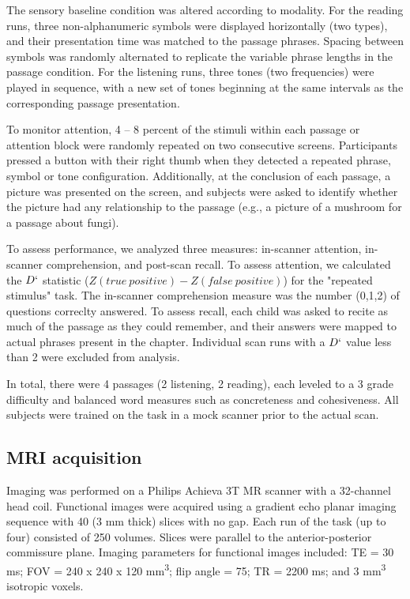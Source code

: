 The sensory baseline condition was altered according to modality. For the reading runs, three non-alphanumeric symbols were displayed horizontally (two types), and their presentation time was matched to the passage phrases. Spacing between symbols was randomly alternated to replicate the variable phrase lengths in the passage condition. For the listening runs, three tones (two frequencies) were played in sequence, with a new set of tones beginning at the same intervals as the corresponding passage presentation. 

To monitor attention, 4 – 8 percent of the stimuli within each passage or attention block were randomly repeated on two consecutive screens.  Participants pressed a button with their right thumb when they detected a repeated phrase, symbol or tone configuration. Additionally, at the conclusion of each passage, a picture was presented on the screen, and subjects were asked to identify whether the picture had any relationship to the passage (e.g., a picture of a mushroom for a passage about fungi). 

To assess performance, we analyzed three measures: in-scanner attention, in-scanner comprehension, and post-scan recall. To assess attention, we calculated the $D`$ statistic ($Z(true\ positive) - Z(false\ positive)$) for the "repeated stimulus" task. The in-scanner comprehension measure was the number (0,1,2) of questions correclty answered. To assess recall, each child was asked to recite as much of the passage as they could remember, and their answers were mapped to actual phrases present in the chapter. Individual scan runs with a $D`$ value less than 2 were excluded from analysis.

In total, there were 4 passages (2 listening, 2 reading), each leveled to a 3 grade difficulty and balanced word measures such as concreteness and cohesiveness.  All subjects were trained on the task in a mock scanner prior to the actual scan. 


\subsection{MRI acquisition}

Imaging was performed on a Philips Achieva 3T MR scanner with a 32-channel head coil. Functional images were acquired using a gradient echo planar imaging sequence with 40 (3 mm thick) slices with no gap. Each run of the task (up to four) consisted of 250 volumes. Slices were parallel to the anterior-posterior commissure plane. Imaging parameters for functional images included: TE = 30 ms; FOV = 240 x 240 x 120 mm\textsuperscript{3}; flip angle = 75\degree; TR = 2200 ms; and 3 mm\textsuperscript{3} isotropic voxels.

